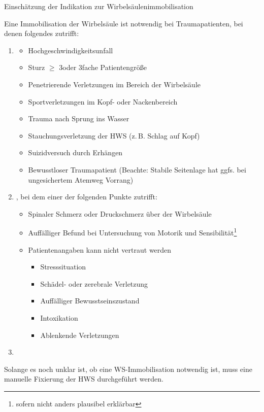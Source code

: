 {Einschätzung der Indikation zur Wirbelsäulenimmobilisation}
{\label{m:einschaetzung-indikation-ws-immobilisation}}
{%
Eine Immobilisation der Wirbelsäule ist notwendig bei
Traumapatienten, bei denen folgendes zutrifft:

\begin{enumerate}
  \item {}
  \begin{itemize}
    \item Hochgeschwindigkeitsunfall
    \item Sturz $\geq$ 3\Meter* oder 3fache Patientengröße
    \item Penetrierende Verletzungen im Bereich der
    Wirbelsäule
    \item Sportverletzungen im Kopf- oder Nackenbereich
    \item Trauma nach Sprung ins Wasser
    \item Stauchungsverletzung der HWS (z.\,B. Schlag auf
    Kopf)
    \item Suizidversuch durch Erhängen
    \item Bewusstloser Traumapatient 
    (Beachte: Stabile Seitenlage hat ggfs. bei ungesichertem Atemweg Vorrang)
  \end{itemize}
  \item {}, bei dem einer der
  folgenden Punkte zutrifft:
  \begin{itemize}
    \item Spinaler Schmerz oder Druckschmerz über der
    Wirbelsäule
    \item Auffälliger Befund bei Untersuchung von Motorik
    und Sensibilität\footnote{sofern nicht anders plausibel
    erklärbar}
    \item Patientenangaben kann nicht vertraut
    werden
    \begin{itemize}
      \item Stresssituation
      \item Schädel- oder zerebrale Verletzung
      \item Auffälliger Bewusstseinszustand
      \item Intoxikation
      \item Ablenkende Verletzungen
    \end{itemize}
  \end{itemize}
  \item {}
\end{enumerate}

Solange es noch unklar ist, ob eine WS-Immobilisation
notwendig ist, muss eine manuelle Fixierung der HWS
durchgeführt werden.

\cite{ITLSde6,ScholzNotfallmedizin2,SiewertChirurgie8}
}

